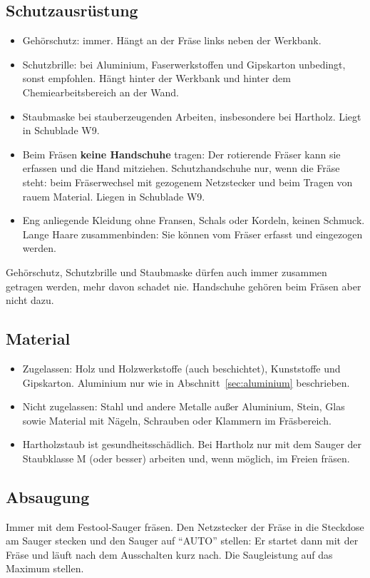\documentclass{\basedir/fablab-document}
\begin{document}
	\subsection{Schutzausrüstung}
	\begin{itemize}
		\item Gehörschutz: immer. Hängt an der Fräse links neben der Werkbank.
		\item Schutzbrille: bei Aluminium, Faserwerkstoffen und Gipskarton unbedingt, sonst empfohlen. Hängt hinter der Werkbank und hinter dem Chemiearbeitsbereich an der Wand.
		\item Staubmaske bei stauberzeugenden Arbeiten, insbesondere bei Hartholz. Liegt in Schublade W9.
		\item Beim Fräsen \textbf{keine Handschuhe} tragen: Der rotierende Fräser kann sie erfassen und die Hand mitziehen. Schutzhandschuhe nur, wenn die Fräse steht: beim Fräserwechsel mit gezogenem Netzstecker und beim Tragen von rauem Material. Liegen in Schublade W9.
		\item Eng anliegende Kleidung ohne Fransen, Schals oder Kordeln, keinen Schmuck. Lange Haare zusammenbinden: Sie können vom Fräser erfasst und eingezogen werden.
	\end{itemize}
	Gehörschutz, Schutzbrille und Staubmaske dürfen auch immer zusammen getragen werden, mehr davon schadet nie. Handschuhe gehören beim Fräsen aber nicht dazu.

	\subsection{Material}
	\begin{itemize}
		\item Zugelassen: Holz und Holzwerkstoffe (auch beschichtet), Kunststoffe und Gipskarton. Aluminium nur wie in Abschnitt~\ref{sec:aluminium} beschrieben.
		\item Nicht zugelassen: Stahl und andere Metalle außer Aluminium, Stein, Glas sowie Material mit Nägeln, Schrauben oder Klammern im Fräsbereich.
		\item Hartholzstaub ist gesundheitsschädlich. Bei Hartholz nur mit dem Sauger der Staubklasse M (oder besser) arbeiten und, wenn möglich, im Freien fräsen.
	\end{itemize}

	\subsection{Absaugung}
	Immer mit dem Festool-Sauger fräsen. Den Netzstecker der Fräse in die Steckdose am Sauger stecken und den Sauger auf \enquote{AUTO} stellen: Er startet dann mit der Fräse und läuft nach dem Ausschalten kurz nach. Die Saugleistung auf das Maximum stellen.
\end{document}
